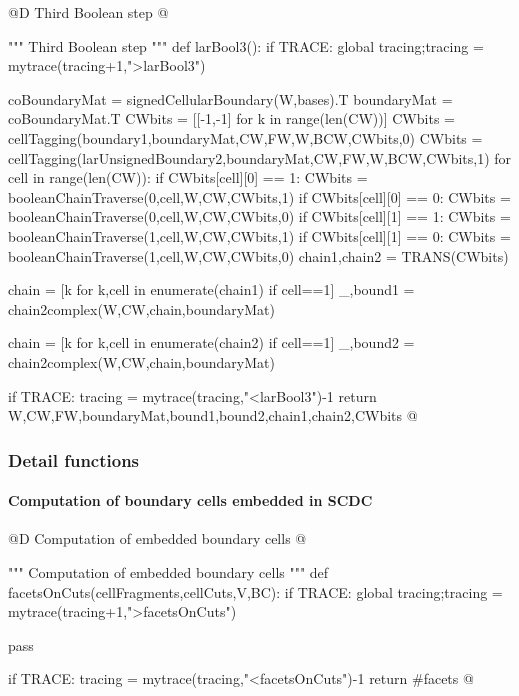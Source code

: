 \documentclass[11pt,oneside]{article}	%
\begin{document}
@D Third Boolean step
@{""" Third Boolean step """
def larBool3():
	if TRACE: global tracing;tracing = mytrace(tracing+1,">larBool3")

	coBoundaryMat = signedCellularBoundary(W,bases).T
	boundaryMat = coBoundaryMat.T
	CWbits = [[-1,-1] for k in range(len(CW))]
	CWbits = cellTagging(boundary1,boundaryMat,CW,FW,W,BCW,CWbits,0)
	CWbits = cellTagging(larUnsignedBoundary2,boundaryMat,CW,FW,W,BCW,CWbits,1)
	for cell in range(len(CW)):
		if CWbits[cell][0] == 1:
			CWbits = booleanChainTraverse(0,cell,W,CW,CWbits,1)		
		if CWbits[cell][0] == 0:
			CWbits = booleanChainTraverse(0,cell,W,CW,CWbits,0)
		if CWbits[cell][1] == 1:
			CWbits = booleanChainTraverse(1,cell,W,CW,CWbits,1)
		if CWbits[cell][1] == 0:
			CWbits = booleanChainTraverse(1,cell,W,CW,CWbits,0)
	chain1,chain2 = TRANS(CWbits)
	
	chain = [k for k,cell in enumerate(chain1) if cell==1]
	_,bound1 = chain2complex(W,CW,chain,boundaryMat)
	
	chain = [k for k,cell in enumerate(chain2) if cell==1]
	_,bound2 = chain2complex(W,CW,chain,boundaryMat)
	

	if TRACE: tracing = mytrace(tracing,"<larBool3")-1
	return W,CW,FW,boundaryMat,bound1,bound2,chain1,chain2,CWbits
@}

\subsubsection{Detail functions}



\paragraph{Computation of boundary cells embedded in SCDC}

@D Computation of embedded boundary cells
@{""" Computation of embedded boundary cells """
def facetsOnCuts(cellFragments,cellCuts,V,BC):
	if TRACE: global tracing;tracing = mytrace(tracing+1,">facetsOnCuts")



	pass

	if TRACE: tracing = mytrace(tracing,"<facetsOnCuts")-1
	return #facets
@}
\end{document}
